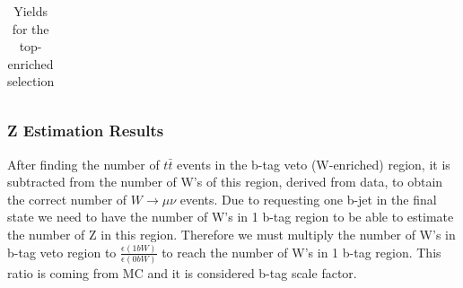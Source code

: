 \begin{table}[!htb]
\begin{center}
\begin{tabular}{lccccccccc}

\hline\hline 
\end{tabular} 
\caption{Yields for the top-enriched selection}
\label{tab:toEnrichyields}
\end{center} 
\end{table}

\subsubsection{Z Estimation Results}
After finding the number of $t\bar{t}$ events in the b-tag veto (W-enriched) region, it is subtracted from the number of W's of this region, derived from data, to obtain the correct number of $W\rightarrow\mu\nu$ events. Due to requesting one b-jet in the final state we need to have the number of W's in 1 b-tag region to be able to estimate the number of Z in this region. Therefore we must multiply the number of W's in b-tag veto region to $\frac{\epsilon(1b W)}{\epsilon(0b W)}$ to reach the number of W's in 1 b-tag region. This ratio is coming from MC and it is considered b-tag scale factor.   

